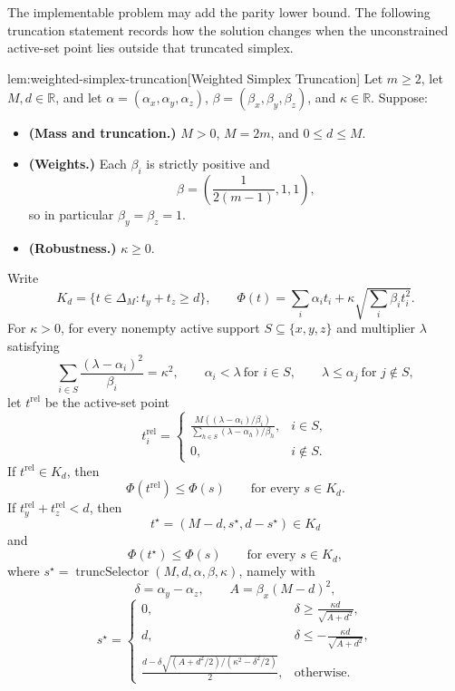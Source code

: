 The implementable problem may add the parity lower bound. The following truncation statement records how the solution changes when the unconstrained active-set point lies outside that truncated simplex.

\begin{lemmav}{lem:weighted-simplex-truncation}[Weighted Simplex Truncation]
Let \(m\ge 2\), let \(M,d\in\mathbb R\), and let \(\alpha=(\alpha_x,\alpha_y,\alpha_z)\), \(\beta=(\beta_x,\beta_y,\beta_z)\), and \(\kappa\in\mathbb R\). Suppose:
\begin{itemize}
\item \textbf{(Mass and truncation.)} \(M>0\), \(M=2m\), and \(0\le d\le M\).
\item \textbf{(Weights.)} Each \(\beta_i\) is strictly positive and
\[
\beta=\left(\frac{1}{2(m-1)},1,1\right),
\]
so in particular \(\beta_y=\beta_z=1\).
\item \textbf{(Robustness.)} \(\kappa\ge 0\).
\end{itemize}
Write
\[
K_d=\{t\in\Delta_M:t_y+t_z\ge d\},
\qquad
\Phi(t)=\sum_i\alpha_i t_i+\kappa\sqrt{\sum_i\beta_i t_i^2}.
\]
For \(\kappa>0\), for every nonempty active support \(S\subseteq\{x,y,z\}\) and multiplier \(\lambda\) satisfying
\[
\sum_{i\in S}\frac{(\lambda-\alpha_i)^2}{\beta_i}=\kappa^2,\qquad
\alpha_i<\lambda\ \text{for }i\in S,\qquad
\lambda\le \alpha_j\ \text{for }j\notin S,
\]
let \(t^{\mathrm{rel}}\) be the active-set point
\[
t^{\mathrm{rel}}_i=
\begin{cases}
\displaystyle
\frac{M((\lambda-\alpha_i)/\beta_i)}
{\sum_{h\in S}(\lambda-\alpha_h)/\beta_h}, & i\in S,\\[1em]
0, & i\notin S .
\end{cases}
\]
If \(t^{\mathrm{rel}}\in K_d\), then
\[
\Phi(t^{\mathrm{rel}})\le \Phi(s)
\qquad\text{for every }s\in K_d.
\]
If \(t^{\mathrm{rel}}_y+t^{\mathrm{rel}}_z<d\), then
\[
t^\star=(M-d,s^\star,d-s^\star)\in K_d
\]
and
\[
\Phi(t^\star)\le \Phi(s)
\qquad\text{for every }s\in K_d,
\]
where \(s^\star=\operatorname{truncSelector}(M,d,\alpha,\beta,\kappa)\), namely with
\[
\delta=\alpha_y-\alpha_z,\qquad A=\beta_x(M-d)^2,
\]
\[
s^\star=
\begin{cases}
0, & \displaystyle \delta\ge \frac{\kappa d}{\sqrt{A+d^2}},\\[0.8em]
d, & \displaystyle \delta\le -\frac{\kappa d}{\sqrt{A+d^2}},\\[0.8em]
\displaystyle
\frac{d-\delta\sqrt{(A+d^2/2)/(\kappa^2-\delta^2/2)}}{2},
& \text{otherwise.}
\end{cases}
\]


\end{lemmav}
